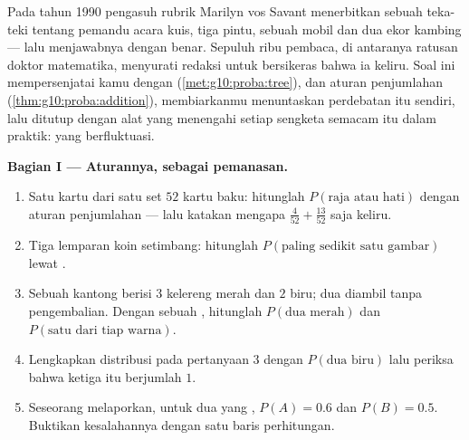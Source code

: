 \begin{problem}
\label{pb:g10:proba:1}
Pada tahun 1990 pengasuh rubrik Marilyn vos Savant menerbitkan sebuah teka-teki
tentang pemandu acara kuis, tiga pintu, sebuah mobil dan dua ekor kambing ---
lalu menjawabnya dengan benar. Sepuluh ribu pembaca, di antaranya ratusan
doktor matematika, menyurati redaksi untuk bersikeras bahwa ia keliru. Soal
ini mempersenjatai kamu dengan  (\cref{met:g10:proba:tree}),
 dan aturan penjumlahan
(\cref{thm:g10:proba:addition}), membiarkanmu menuntaskan perdebatan itu
sendiri, lalu ditutup dengan alat yang menengahi setiap sengketa semacam itu
dalam praktik:  yang berfluktuasi.

\medskip
\noindent\textbf{Bagian I --- Aturannya, sebagai pemanasan.}
\begin{enumerate}
  \item Satu kartu dari satu set $52$ kartu baku: hitunglah
        $P(\text{raja atau hati})$ dengan aturan penjumlahan ---
        lalu katakan mengapa $\frac{4}{52} + \frac{13}{52}$ saja
        keliru.
  \item Tiga lemparan koin setimbang: hitunglah $P(\text{paling sedikit satu
        gambar})$ lewat .
  \item Sebuah kantong berisi $3$ kelereng merah dan $2$ biru; dua diambil
        tanpa pengembalian. Dengan sebuah , hitunglah
        $P(\text{dua merah})$ dan $P(\text{satu dari tiap warna})$.
  \item Lengkapkan distribusi pada pertanyaan 3 dengan
        $P(\text{dua biru})$ lalu periksa bahwa ketiga  itu
        berjumlah $1$.
  \item Seseorang melaporkan, untuk dua  yang \emph{},
        $P(A) = 0.6$ dan $P(B) = 0.5$. Buktikan kesalahannya dengan satu
        baris perhitungan.
\end{enumerate}


\end{problem}
